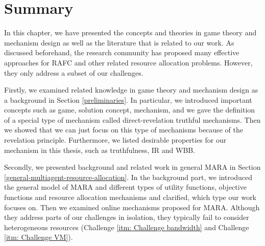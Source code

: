 \documentclass[11pt]{phdthesis}
\begin{document}
\section{Summary} \label{literature review summary}

In this chapter, we have presented the concepts and theories in game theory and mechanism design as well as the literature that is related to our work. As discussed beforehand, the research community has proposed many effective approaches for RAFC and other related resource allocation problems. However, they only address a subset of our challenges.

Firstly, we examined related knowledge in game theory and mechanism design as a background in Section \ref{preliminaries}. In particular, we introduced important concepts such as game, solution concept, mechanism, and we gave the definition of a special type of mechanism called direct-revelation truthful mechanisms. Then we showed that we can just focus on this type of mechanisms because of the revelation principle. Furthermore, we listed desirable properties for our mechanism in this thesis, such as truthfulness, IR and WBB. 

Secondly, we presented background and related work in general MARA in Section \ref{general-multiagent-resource-allocation}. In the background part, we introduced the general model of MARA and different types of utility functions, objective functions and resource allocation mechanisms and clarified, which type our work focuses on. Then we examined online mechanisms proposed for MARA. Although they address parts of our challenges in isolation, they typically fail to consider heterogeneous resources (Challenge \ref{itm: Challenge bandwidth} and Challenge \ref{itm: Challenge VM}).

\end{document}
